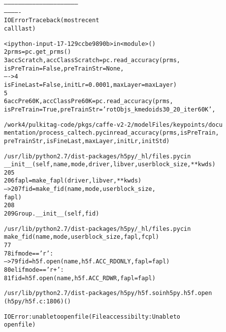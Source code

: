 \documentclass[letterpaper,10pt,english]{/usr/share/sphinx/texinputs/sphinxhowto}
\begin{document}
    

        
        

            
                
            \begin{alltt}

        --------------------------------------------------------------
-------------
    IOError                                   Traceback (most recent
call last)



        <ipython-input-17-129ccbe9890b> in <module>()
          2 prms = pc.get\_prms()
          3 accScratch, accClassScratch = pc.read\_accuracy(prms,
isPreTrain=False, preTrainStr=None,
    ----> 4
isFineLast=False, initLr=0.0001, maxLayer=maxLayer)
          5
          6 accPre60K, accClassPre60K = pc.read\_accuracy(prms,
isPreTrain=True, preTrainStr='rotObjs\_kmedoids30\_20\_iter60K',




        /work4/pulkitag-code/pkgs/caffe-v2-2/modelFiles/keypoints/docu
mentation/process\_caltech.pyc in read\_accuracy(prms, isPreTrain,
preTrainStr, isFineLast, maxLayer, initLr, initStd)




        /usr/lib/python2.7/dist-packages/h5py/\_hl/files.pyc in
\_\_init\_\_(self, name, mode, driver, libver, userblock\_size, **kwds)
        205
        206             fapl = make\_fapl(driver, libver, **kwds)
    --> 207             fid = make\_fid(name, mode, userblock\_size,
fapl)
        208
        209         Group.\_\_init\_\_(self, fid)




        /usr/lib/python2.7/dist-packages/h5py/\_hl/files.pyc in
make\_fid(name, mode, userblock\_size, fapl, fcpl)
         77
         78     if mode == 'r':
    ---> 79         fid = h5f.open(name, h5f.ACC\_RDONLY, fapl=fapl)
         80     elif mode == 'r+':
         81         fid = h5f.open(name, h5f.ACC\_RDWR, fapl=fapl)




        /usr/lib/python2.7/dist-packages/h5py/h5f.so in h5py.h5f.open
(h5py/h5f.c:1806)()




        IOError: unable to open file (File accessibilty: Unable to
open file)

\end{alltt}
        
\end{document}
